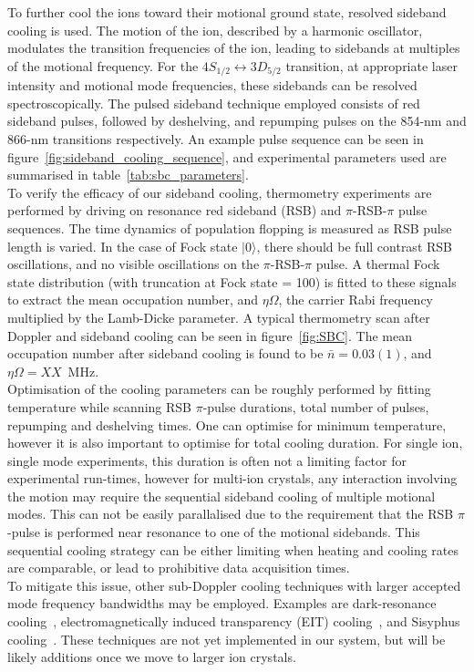     To further cool the ions toward their motional ground state, resolved
    sideband cooling is used. The motion of the ion, described by a harmonic oscillator,
    modulates the transition frequencies of the ion, leading to sidebands at
    multiples of the motional frequency. For the $4S_{1/2} \leftrightarrow
    3D_{5/2}$ transition, at appropriate laser intensity and motional mode
    frequencies, these sidebands can be resolved spectroscopically. The pulsed
    sideband technique employed consists of red sideband pulses, followed by
    deshelving, and repumping pulses on the 854-nm and 866-nm transitions
    respectively. An example pulse sequence can be seen in
    figure~\ref{fig:sideband_cooling_sequence}, and experimental parameters used are summarised in table~\ref{tab:sbc_parameters}. \\
    To verify the efficacy of our sideband cooling, thermometry
    experiments are performed by driving on resonance red sideband (RSB) and $\pi$-RSB-$\pi$ pulse
    sequences. The time dynamics of population flopping is measured as RSB
    pulse length is varied. In the case of Fock state $|0\rangle$, there should be full contrast 
    RSB oscillations, and no visible oscillations on the $\pi$-RSB-$\pi$ pulse. A thermal
    Fock state distribution (with truncation at Fock state = 100) is fitted to these
    signals to extract the mean occupation number, and $\eta\Omega$, the carrier
    Rabi frequency multiplied by the Lamb-Dicke parameter. A typical thermometry
    scan after Doppler and sideband cooling can be seen in
    figure~\ref{fig:SBC}. The mean occupation
    number after sideband cooling is found to be $\bar{n} = 0.03(1)$, and $\eta\Omega =
    XX$~MHz.\\
    Optimisation of the cooling parameters can be roughly performed by fitting
    temperature while scanning RSB $\pi$-pulse durations, total number of pulses,
    repumping and deshelving times. One can optimise for minimum temperature,
    however it is also important to optimise for total cooling duration. For
    single ion, single mode experiments, this duration is often not a limiting factor for experimental run-times,
    however for multi-ion crystals, any interaction involving the motion may
    require the sequential sideband cooling of multiple motional modes. This can
    not be easily parallalised due to the requirement that the RSB $\pi$-pulse is
    performed near resonance to one of the motional sidebands. This sequential
    cooling strategy can be either limiting when heating and cooling rates are
    comparable, or lead to prohibitive data acquisition times.\\
    To mitigate this issue, other sub-Doppler cooling techniques with larger
    accepted mode frequency bandwidths may be employed. Examples are dark-resonance
    cooling~\cite{}, electromagnetically induced transparency (EIT) cooling~\cite{}, and
    Sisyphus cooling~\cite{}. These techniques are not yet implemented in our system,
    but will be likely additions once we move to larger ion crystals.\\

